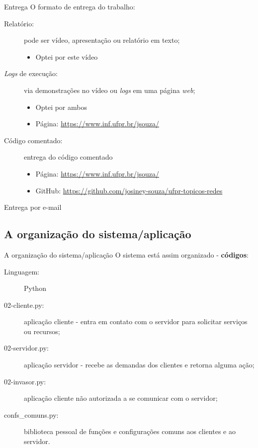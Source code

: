 \documentclass[xcolor=dvipsnames,table]{beamer}
\begin{document}
\begin{frame}{Entrega}
	O formato de entrega do trabalho:
	\begin{description}
		\item[Relatório:] pode ser vídeo, apresentação ou relatório em texto;
		\begin{itemize}
			\item Optei por este vídeo
		\end{itemize} \pause
		
		\item[\textit{Logs} de execução:] via demonstrações no vídeo ou \textit{logs} em uma página \textit{web};
		\begin{itemize}
			\item Optei por ambos
			\item Página: \url{https://www.inf.ufpr.br/jsouza/}
		\end{itemize} \pause
		
		\item[Código comentado:] entrega do código comentado
		\begin{itemize}
			\item Página: \url{https://www.inf.ufpr.br/jsouza/}
			\item GitHub: \url{https://github.com/josiney-souza/ufpr-topicos-redes}
		\end{itemize}
	\end{description}
	Entrega por e-mail
\end{frame}

\subsection{A organização do sistema/aplicação}
\begin{frame}{A organização do sistema/aplicação}
	O sistema está assim organizado - \textbf{códigos}:
	\begin{description}
		\item[Linguagem:] Python
		\item[02-cliente.py:] aplicação cliente - entra em contato com o servidor para solicitar serviços ou recursos;
		\item[02-servidor.py:] aplicação servidor - recebe as demandas dos clientes e retorna alguma ação;
		\item[02-invasor.py:] aplicação cliente não autorizada a se comunicar com o servidor;
		\item[confs\_comuns.py:] biblioteca pessoal de funções e configurações comuns aos clientes e ao servidor.
	\end{description}
\end{frame}
\end{document}
